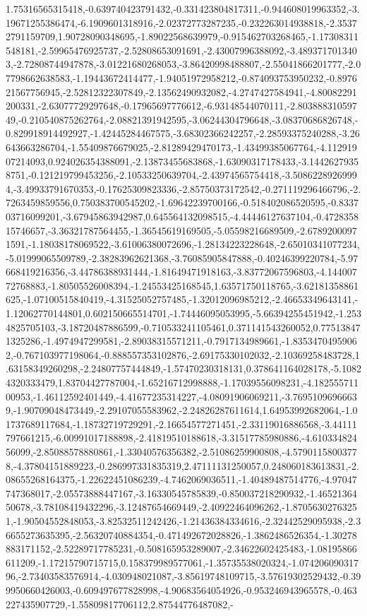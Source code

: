 \documentclass{article}
\begin{document}
1.75316565315418,-0.639740423791432,-0.331423804817311,-0.944608019963352,-3.19671255386474,-6.1909601318916,-2.02372773287235,-0.232263014938818,-2.35372791159709,1.90728090348695,-1.89022568639979,-0.915462703268465,-1.17308311548181,-2.59965476925737,-2.52808653091691,-2.43007996388092,-3.4893717013403,-2.72808744947878,-3.01221680268053,-3.86420998488807,-2.55041866201777,-2.07798662638583,-1.19443672414477,-1.94051972958212,-0.874093753950232,-0.897621567756945,-2.52812322307849,-2.13562490932082,-4.2747427584941,-4.80082291200331,-2.63077729297648,-0.17965697776612,-6.93148544070111,-2.80388831059749,-0.210540875262764,-2.08821391942595,-3.06244304796648,-3.08370686826748,-0.829918914492927,-1.42445284467575,-3.68302366242257,-2.28593375240288,-3.26643663286704,-1.55409876679025,-2.81289429470173,-1.43499385067764,-4.11291907214093,0.924026354388091,-2.13873455683868,-1.63090317178433,-3.14426279358751,-0.121219799453256,-2.10533250639704,-2.43974565754418,-3.50862289269994,-3.49933791670353,-0.17625309823336,-2.85750373172542,-0.271119296466796,-2.7263459859556,0.750383700545202,-1.69642239700166,-0.518402086520595,-0.833703716099201,-3.67945863942987,0.645564132098515,-4.44446127637104,-0.472835815746657,-3.36321787564455,-1.36545619169505,-5.05598216689509,-2.67892000971591,-1.18038178069522,-3.61006380072696,-1.28134223228648,-2.65010341077234,-5.01999065509789,-2.38283962621368,-3.76085905847888,-0.40246399220784,-5.97668419216356,-3.44786388931444,-1.81649471918163,-3.83772067596803,-4.14400772768883,-1.80505526008394,-1.24553425168545,1.63571750118765,-3.62181358861625,-1.07100515840419,-4.31525052757485,-1.32012096985212,-2.46653349643141,-1.12062770144801,0.602150665514701,-1.74446095053995,-5.66394255451942,-1.2534825705103,-3.18720487886599,-0.710533241105461,0.371141543260052,0.775138471325286,-1.4974947299581,-2.89038315571211,-0.7917134989661,-1.83534704959062,-0.767103977198064,-0.888557353102876,-2.69175330102032,-2.10369258483728,1.63158349260298,-2.24807757444849,-1.57470230318131,0.378641164028178,-5.10824320333479,1.83704427787004,-1.65216712998888,-1.17039556098231,-4.18255571100953,-1.46112592401449,-4.41677235314227,-4.08091906069211,-3.76951096966639,-1.90709048473449,-2.29107055583962,-2.24826287611614,1.64953992682064,-1.01737689117684,-1.18732719729291,-2.16654577271451,-2.33119016886568,-3.44111797661215,-6.00991017188898,-2.41819510188618,-3.31517785980886,-4.61033482456099,-2.85088578880861,-1.33040576356382,-2.51086259900808,-4.57901158003778,-4.37804151889223,-0.286997331835319,2.47111131250057,0.248060183613831,-2.08655268164375,-1.22622451086239,-4.7462069036511,-1.40489487514776,-4.97047747368017,-2.05573888447167,-3.16330545785839,-0.850037218290932,-1.4652136450678,-3.78108419432296,-3.12487654669449,-2.40922464096262,-1.87056302763251,-1.90504552848053,-3.82532511242426,-1.21436384334616,-2.32442529095938,-2.36655273635395,-2.56320740884354,-0.471492672028826,-1.3862486526354,-1.30278883171152,-2.52289717785231,-0.508165953289007,-2.34622602425483,-1.08195866611209,-1.17215790715715,0.158379989577061,-1.35735538020324,-1.07420609031796,-2.73403583576914,-4.030948021087,-3.85619748109715,-3.57619302529432,-0.399950660426003,-0.609497677828998,-4.90683564054926,-0.953246943965578,-0.463227435907729,-1.55809817706112,2.87544776487082,-
\end{document}
